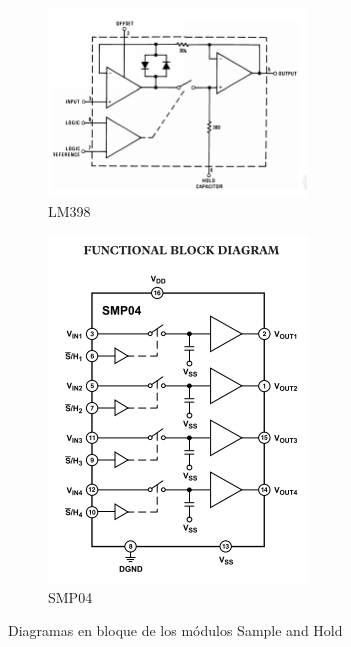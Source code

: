 \begin{figure}[H]
	\begin{subfigure}{0.5\textwidth}
		\includegraphics[width=0.9\linewidth, height=5cm]{ImagenesEjercicio4/FunctionalDiagramLM398.PNG} 
		\caption{LM398}
		\label{fig:subim1}
	\end{subfigure}
	\begin{subfigure}{0.5\textwidth}
		\includegraphics[scale=0.8]{ImagenesEjercicio4/FunctionalDiagramSMP04.PNG}
		\caption{SMP04}
		\label{fig:subim2}
	\end{subfigure}
	\caption{Diagramas en bloque de los módulos Sample and Hold}
	\label{fig:image2}
\end{figure}

%